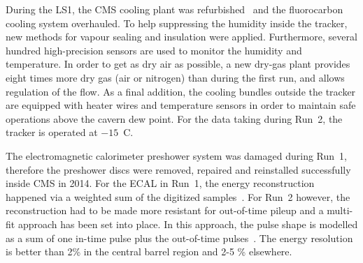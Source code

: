 During the LS1, the CMS cooling plant was refurbished~\cite{running:1998606} and the fluorocarbon cooling system overhauled. To help suppressing the humidity inside the tracker, new methods for vapour sealing and insulation were applied. Furthermore, several hundred high-precision sensors are used to monitor the humidity and temperature. In order to get as dry air as possible, a new dry-gas plant provides eight times more dry gas (air or nitrogen) than during the first run, and allows regulation of the flow. As a final addition, the cooling bundles outside the tracker are equipped with heater wires and temperature sensors in order to maintain safe operations above the cavern dew point. For the data taking during Run~2, the tracker is operated at $-15$~\degree C.

%		
%	




The electromagnetic calorimeter preshower system was damaged during Run~1, therefore the preshower discs were removed, repaired and reinstalled successfully inside CMS in 2014. For the ECAL in Run~1, the energy reconstruction happened  via a weighted sum of the digitized samples~\cite{Chatrchyan:2013dga}. For Run~2 however, the reconstruction had to be made more resistant for out-of-time pileup and a multi-fit approach has been set into place. In this approach, the pulse shape is modelled as a sum of one in-time pulse plus the out-of-time pulses~\cite{1748-0221-12-01-C01069}. The energy resolution is better than 2\%  in the central barrel region and 2-5 \% elsewhere.




